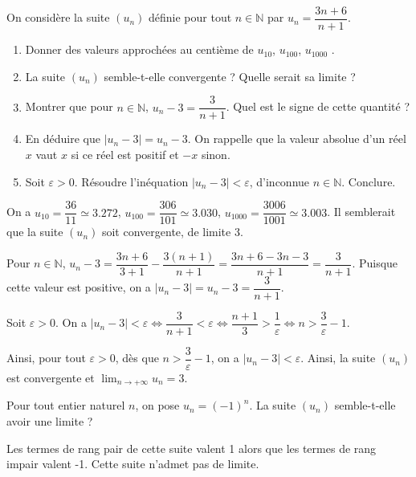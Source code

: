 \documentclass[11pt,fleqn]{book} %
\begin{document}
\begin{exercise}


On considère la suite $(u_n)$ définie pour tout $n\in\mathbb{N}$ par $u_n=\dfrac{3n+6}{n+1}$.
\begin{enumerate}
\item Donner des valeurs approchées au centième de $u_{10}$, $u_{100}$, $u_{1000}$ .
\item La suite $(u_n)$ semble-t-elle convergente ? Quelle serait sa limite ?
\item Montrer que pour $n\in\mathbb{N}$, $u_n-3=\dfrac{3}{n+1}$. Quel est le signe de cette quantité ?
\item En déduire que $|u_n-3|=u_n-3$. On rappelle que la valeur absolue d'un réel $x$ vaut $x$ si ce réel est positif et $-x$ sinon.
\item Soit $\varepsilon >0$. Résoudre l'inéquation $\left\lvert u_n - 3 \right\rvert < \varepsilon$, d'inconnue $n\in\mathbb{N}$. Conclure.
\end{enumerate}\end{exercise}
\begin{solution}On a $u_{10}=\dfrac{36}{11}\simeq 3.272$, $u_{100}=\dfrac{306}{101}\simeq 3.030$, $u_{1000}=\dfrac{3006}{1001}\simeq 3.003$. Il semblerait que la suite $(u_n)$ soit convergente, de limite 3.

Pour $n\in\mathbb{N}$, $u_n-3=\dfrac{3n+6}{3+1}-\dfrac{3(n+1)}{n+1}=\dfrac{3n+6-3n-3}{n+1}=\dfrac{3}{n+1}$. Puisque cette valeur est positive, on a $|u_n-3|=u_n-3=\dfrac{3}{n+1}$.

Soit $\varepsilon >0$. On a $\left\lvert u_n - 3 \right\rvert < \varepsilon \Leftrightarrow \dfrac{3}{n+1}< \varepsilon \Leftrightarrow \dfrac{n+1}{3} > \dfrac{1}{\varepsilon} \Leftrightarrow n > \dfrac{3}{\varepsilon}-1$.

Ainsi, pour tout $\varepsilon > 0$, dès que $n > \dfrac{3}{\varepsilon}-1$, on a $\left\lvert u_n - 3 \right\rvert < \varepsilon$. Ainsi, la suite $(u_n)$ est convergente et $\displaystyle \lim _{n\to + \infty}u_n=3$.\end{solution}



\begin{exercise}Pour tout entier naturel $n$, on pose $u_n=(-1)^n$. La suite $(u_n)$ semble-t-elle avoir une limite ?\end{exercise}
\begin{solution}Les termes de rang pair de cette suite valent 1 alors que les termes de rang impair valent -1. Cette suite n'admet pas de limite.\end{solution}
\end{document}
